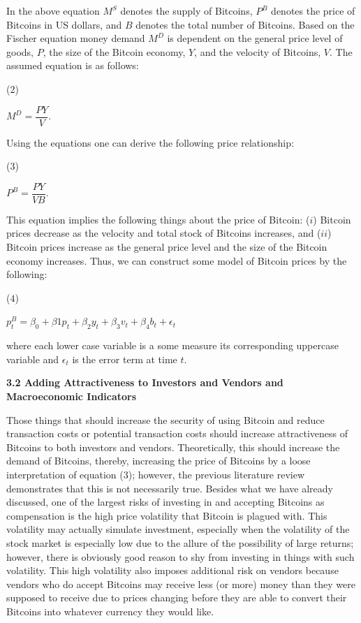 \documentclass{article}[10 pt]
\newcommand{\vs}{\vspace{0.1in}}
\begin{document}
In the above equation $M^{S}$ denotes the supply of Bitcoins, $P^{B}$
denotes the price of Bitcoins in US dollars, and $B$ denotes the total
number of Bitcoins. Based on the Fischer equation money demand $M^{D}$ is
dependent on the general price level of goods, $P$, the size of the Bitcoin
economy, $Y$, and the velocity of Bitcoins, $V$. The assumed equation is as
follows:

\vs

($2$) \begin{center} $M^{D} = \dfrac{PY}{V}$. \end{center}

\vs

Using the equations one can derive the following price relationship:

\vs

($3$) \begin{center} $P^{B} = \dfrac{PY}{VB}$. \end{center}

\vs

This equation implies the following things about the price of Bitcoin: ($i$)
Bitcoin prices decrease as the velocity and total stock of Bitcoins
increases, and ($ii$) Bitcoin prices increase as the general price level and
the size of the Bitcoin economy increases. Thus, we can construct some model
of Bitcoin prices by the following:

\vs

($4$) \begin{center} $p_{t}^{B} = \beta_{0} + \beta{1}p_t + \beta_{2}y_t +
    \beta_{3}v_t + \beta_{4}b_t + \epsilon_t$ \end{center}

where each lower case variable is a some measure its corresponding uppercase
variable and $\epsilon_t$ is the error term at time $t$.

\vs

\textbf{3.2 Adding Attractiveness to Investors and Vendors and Macroeconomic
Indicators}

\vs

Those things that should increase the security of using Bitcoin and reduce
transaction costs or potential transaction costs should increase
attractiveness of Bitcoins to both investors and vendors. Theoretically,
this should increase the demand of Bitcoins, thereby, increasing the price
of Bitcoins by a loose interpretation of equation ($3$); however, the
previous literature review demonstrates that this is not necessarily true.
Besides what we have already discussed, one of the largest risks of
investing in and accepting Bitcoins as compensation is the high price
volatility that Bitcoin is plagued with. This volatility may actually
simulate investment, especially when the volatility of the stock market is
especially low due to the allure of the possibility of large returns;
however, there is obviously good reason to shy from investing in things with
such volatility. This high volatility also imposes additional risk on
vendors because vendors who do accept Bitcoins may receive less (or more) money than
they were supposed to receive due to prices changing before they are able to convert their Bitcoins
into whatever currency they would like.
\end{document}
